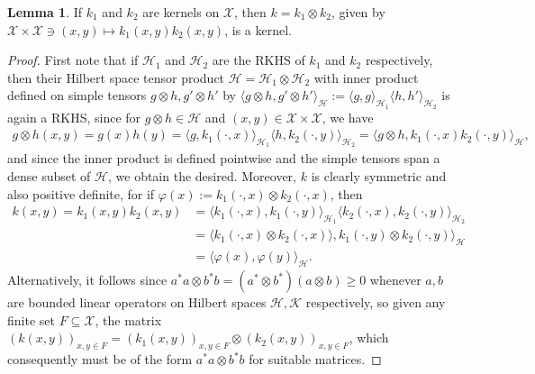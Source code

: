 \documentclass[10pt,twoside,openany,final]{memoir}
\theoremstyle{definition}
\newtheorem{lemma}[theorem]{Lemma}
\theoremstyle{Break}
\renewcommand{\H}{\mathcal{H}}
\begin{document}
\begin{lemma}
	If $k_1$ and $k_2$ are kernels on $\mathcal{X}$, then $k=k_1 \otimes k_2$, given by $\mathcal{X}\times \mathcal{X} \ni \left( x,y \right) \mapsto k_1(x,y)k_2(x,y)$, is a kernel.
	\label{productkern}
\end{lemma}
\begin{proof}
	First note that if $\H_1$ and $\H_2$ are the RKHS of $k_1$ and $k_2$ respectively, then their Hilbert space tensor product $\H= \H_1 \otimes \H_2$ with inner product defined on simple tensors $g\otimes h , g' \otimes h'$ by $\langle g \otimes h , g' \otimes h'\rangle_\H := \langle g , g \rangle_{\H_1} \langle h, h' \rangle_{\H_2}$ is again a RKHS, since for $g\otimes h \in \H$ and $(x,y) \in \mathcal{X} \times \mathcal{X}$, we have
	\begin{align*}
		g \otimes h (x,y) = g(x) h(y) = \langle g , k_1(\cdot,x)\rangle_{\H_1} \langle h , k_2(\cdot,y)\rangle_{\H_2} = \langle g \otimes h , k_1(\cdot,x)k_2(\cdot,y)\rangle_{\H},
	\end{align*}
	and since the inner product is defined pointwise and the simple tensors span a dense subset of $\H$, we obtain the desired. Moreover, $k$ is clearly symmetric and also positive definite, for if $\varphi(x) := k_1(\cdot,x) \otimes k_2(\cdot,x)$, then 
	\begin{align*}
		k(x,y) = k_1(x,y) k_2(x,y) &= \langle k_{1}(\cdot,x), k_{1}(\cdot,y)\rangle_{\H_1} \langle k_{2}(\cdot,x),k_{2}(\cdot,y)\rangle_{\H_2} \\ 
		&= \langle k_{1}(\cdot,x) \otimes k_{2}(\cdot,x)\rangle, k_{1}(\cdot,y) \otimes k_{2}(\cdot,y)\rangle_{\H}\\
		&= \langle \varphi(x), \varphi(y)\rangle_{\H}.
	\end{align*}
	Alternatively, it follows since $a^*a \otimes b^*b = (a^* \otimes b^*)(a \otimes b) \geq 0$ whenever $a,b$ are bounded linear operators on Hilbert spaces $\H, \mathcal{K}$ respectively, so given any finite set $F \subseteq \mathcal{X}$, the matrix $(k(x,y))_{x,y \in F}=(k_1(x,y))_{x,y \in F} \otimes (k_2(x,y))_{x,y \in F}$, which consequently must be of the form $a^*a \otimes b^*b$ for suitable matrices.
\end{proof}
\end{document}
